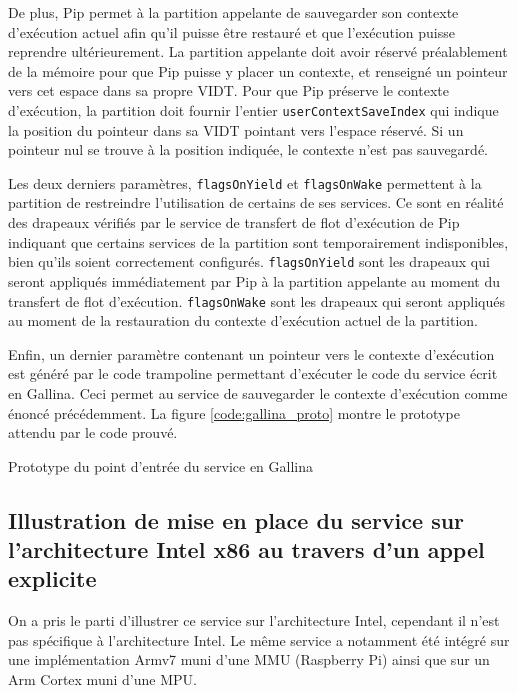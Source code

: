 	De plus, Pip permet à la partition appelante de sauvegarder son contexte d'exécution actuel afin qu'il puisse être restauré et que l'exécution puisse reprendre ultérieurement. La partition appelante doit avoir réservé préalablement de la mémoire pour que Pip puisse y placer un contexte, et renseigné un pointeur vers cet espace dans sa propre VIDT. Pour que Pip préserve le contexte d'exécution, la partition doit fournir l'entier \texttt{userContextSaveIndex} qui indique la position du pointeur dans sa VIDT pointant vers l'espace réservé. Si un pointeur nul se trouve à la position indiquée, le contexte n'est pas sauvegardé.

	Les deux derniers paramètres, \texttt{flagsOnYield} et \texttt{flagsOnWake} permettent à la partition de restreindre l'utilisation de certains de ses services. Ce sont en réalité des drapeaux vérifiés par le service de transfert de flot d'exécution de Pip indiquant que certains services de la partition sont temporairement indisponibles, bien qu'ils soient correctement configurés. \texttt{flagsOnYield} sont les drapeaux qui seront appliqués immédiatement par Pip à la partition appelante au moment du transfert de flot d'exécution. \texttt{flagsOnWake} sont les drapeaux qui seront appliqués au moment de la restauration du contexte d'exécution actuel de la partition.

	Enfin, un dernier paramètre contenant un pointeur vers le contexte d'exécution est généré par le code trampoline permettant d'exécuter le code du service écrit en Gallina. Ceci permet au service de sauvegarder le contexte d'exécution comme énoncé précédemment. La figure \ref{code:gallina_proto} montre le prototype attendu par le code prouvé.

		\begin{listing}[!ht]
			\caption{Prototype du point d'entrée du service en Gallina}
			\label{code:gallina_proto}
		\end{listing}
		
		\subsection{Illustration de mise en place du service sur l'architecture Intel x86 au travers d'un appel explicite}

		On a pris le parti d'illustrer ce service sur l'architecture Intel, cependant il n'est pas spécifique à l'architecture Intel. Le même service a notamment été intégré sur une implémentation Armv7 muni d'une MMU (Raspberry Pi) ainsi que sur un Arm Cortex muni d'une MPU.

